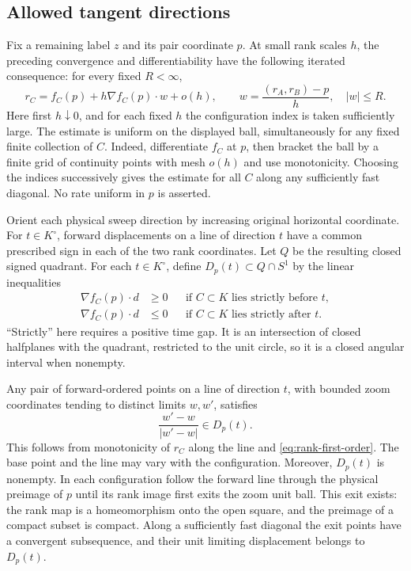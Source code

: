 \subsection{Allowed tangent directions}

Fix a remaining label $z$ and its pair coordinate $p$.
At small rank scales $h$, the preceding convergence and differentiability
have the following iterated consequence: for every fixed $R<\infty$,
\begin{equation}
 r_C=f_C(p)+h\nabla f_C(p)\cdot w+o(h),
 \qquad w=\frac{(r_A,r_B)-p}{h},\quad |w|\le R.
 \label{eq:rank-first-order}
\end{equation}
Here first $h\downarrow0$, and for each fixed $h$ the configuration index
is taken sufficiently large.  The estimate is uniform on the displayed
ball, simultaneously for any fixed finite collection of $C$.
Indeed, differentiate $f_C$ at $p$, then bracket the ball by a finite
grid of continuity points with mesh $o(h)$ and use monotonicity.
Choosing the indices successively gives the estimate for all $C$ along
any sufficiently fast diagonal.  No rate uniform in $p$ is asserted.

Orient each physical sweep direction by increasing original horizontal
coordinate.  For $t\in K^\circ$, forward displacements on a line of
direction $t$ have a common prescribed sign in each of the two rank
coordinates.  Let $Q$ be the resulting closed signed quadrant.
For each $t\in K^\circ$, define $D_p(t)\subset Q\cap S^1$ by the
linear inequalities
\begin{align*}
 \nabla f_C(p)\cdot d&\ge0
   &&\text{if $C\subset K$ lies strictly before $t$},\\
 \nabla f_C(p)\cdot d&\le0
   &&\text{if $C\subset K$ lies strictly after $t$}.
\end{align*}
``Strictly'' here requires a positive time gap.
It is an intersection of closed halfplanes with the quadrant, restricted
to the unit circle, so it is a closed angular interval when nonempty.

Any pair of forward-ordered points on a line of direction $t$, with
bounded zoom coordinates tending to distinct limits $w,w'$, satisfies
\begin{equation}
 \frac{w'-w}{|w'-w|}\in D_p(t).
 \label{eq:all-pairs-direction}
\end{equation}
This follows from monotonicity of $r_C$ along the line and
\eqref{eq:rank-first-order}.  The base point and the line may vary with
the configuration.  Moreover, $D_p(t)$ is nonempty.  In each configuration
follow the forward line through the physical preimage of $p$ until its
rank image first exits the zoom unit ball.  This exit exists: the rank
map is a homeomorphism onto the open square, and the preimage of a compact
subset is compact.  Along a sufficiently fast diagonal the exit points
have a convergent subsequence, and their unit limiting displacement
belongs to $D_p(t)$.

